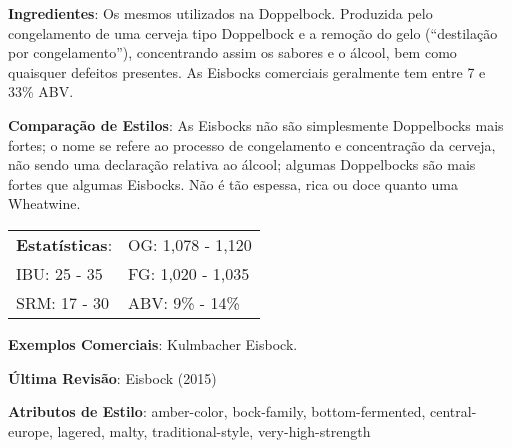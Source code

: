 \textbf{Ingredientes}: Os mesmos utilizados na Doppelbock. Produzida pelo congelamento de uma cerveja tipo Doppelbock e a remoção do gelo (“destilação por congelamento”), concentrando assim os sabores e o álcool, bem como quaisquer defeitos presentes. As Eisbocks comerciais geralmente tem entre 7 e 33\% ABV.

\textbf{Comparação de Estilos}: As Eisbocks não são simplesmente Doppelbocks mais fortes; o nome se refere ao processo de congelamento e concentração da cerveja, não sendo uma declaração relativa ao álcool; algumas Doppelbocks são mais fortes que algumas Eisbocks. Não é tão espessa, rica ou doce quanto uma Wheatwine.

\begin{tabular}{@{}p{35mm}p{35mm}@{}}
  \textbf{Estatísticas}: & OG: 1,078 - 1,120 \\
  IBU: 25 - 35 & FG: 1,020 - 1,035 \\
  SRM: 17 - 30 & ABV: 9\% - 14\%
\end{tabular}

\textbf{Exemplos Comerciais}: Kulmbacher Eisbock.

\textbf{Última Revisão}: Eisbock (2015)

\textbf{Atributos de Estilo}: amber-color, bock-family, bottom-fermented, central-europe, lagered, malty, traditional-style, very-high-strength
